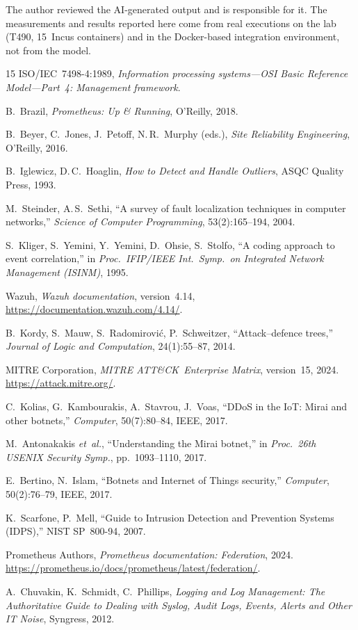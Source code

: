 \documentclass[11pt,a4paper]{article}
\begin{document}
The author reviewed the AI-generated output and is responsible for it. The measurements and
results reported here come from real executions on the lab (T490, 15~Incus containers) and
in the Docker-based integration environment, not from the model.

\begin{thebibliography}{15}
  ISO/IEC~7498-4:1989,
  \emph{Information processing systems---OSI Basic Reference Model---Part~4: Management
  framework}.

  B.~Brazil,
  \emph{Prometheus: Up \& Running},
  O'Reilly, 2018.

  B.~Beyer, C.~Jones, J.~Petoff, N.\,R.~Murphy (eds.),
  \emph{Site Reliability Engineering},
  O'Reilly, 2016.

  B.~Iglewicz, D.\,C.~Hoaglin,
  \emph{How to Detect and Handle Outliers},
  ASQC Quality Press, 1993.

  M.~Steinder, A.\,S.~Sethi,
  ``A survey of fault localization techniques in computer networks,''
  \emph{Science of Computer Programming}, 53(2):165--194, 2004.

  S.~Kliger, S.~Yemini, Y.~Yemini, D.~Ohsie, S.~Stolfo,
  ``A coding approach to event correlation,''
  in \emph{Proc.\ IFIP/IEEE Int.\ Symp.\ on Integrated Network Management (ISINM)}, 1995.

  Wazuh,
  \emph{Wazuh documentation}, version~4.14,
  \url{https://documentation.wazuh.com/4.14/}.

  B.~Kordy, S.~Mauw, S.~Radomirovi\'c, P.~Schweitzer,
  ``Attack--defence trees,''
  \emph{Journal of Logic and Computation}, 24(1):55--87, 2014.

  MITRE Corporation,
  \emph{MITRE ATT\&CK\textregistered\ Enterprise Matrix}, version~15,
  2024.
  \url{https://attack.mitre.org/}.

  C.~Kolias, G.~Kambourakis, A.~Stavrou, J.~Voas,
  ``DDoS in the IoT: Mirai and other botnets,''
  \emph{Computer}, 50(7):80--84, IEEE, 2017.

  M.~Antonakakis \emph{et~al.},
  ``Understanding the Mirai botnet,''
  in \emph{Proc.\ 26th USENIX Security Symp.}, pp.~1093--1110, 2017.

  E.~Bertino, N.~Islam,
  ``Botnets and Internet of Things security,''
  \emph{Computer}, 50(2):76--79, IEEE, 2017.

  K.~Scarfone, P.~Mell,
  ``Guide to Intrusion Detection and Prevention Systems (IDPS),''
  NIST SP~800-94, 2007.

  Prometheus Authors,
  \emph{Prometheus documentation: Federation},
  2024.
  \url{https://prometheus.io/docs/prometheus/latest/federation/}.

  A.~Chuvakin, K.~Schmidt, C.~Phillips,
  \emph{Logging and Log Management: The Authoritative Guide to Dealing with Syslog, Audit Logs, Events, Alerts and Other IT Noise},
  Syngress, 2012.
\end{thebibliography}
\end{document}
